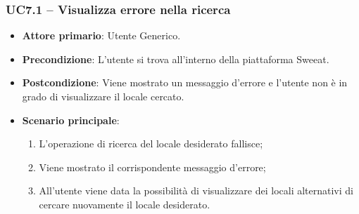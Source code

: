 \subsubsection{UC7.1 – Visualizza errore nella ricerca}
\begin{itemize}
\item \textbf{Attore primario}: Utente Generico.
\item \textbf{Precondizione}: L'utente si trova all’interno della piattaforma Sweeat.
\item \textbf{Postcondizione}: Viene mostrato un messaggio d'errore e l'utente non è in grado di visualizzare il locale cercato.

\item \textbf{Scenario principale}:
\begin{enumerate}
	\item L'operazione di ricerca del locale desiderato fallisce;
	\item Viene mostrato il corrispondente messaggio d'errore;
	\item All'utente viene data la possibilità di visualizzare dei locali alternativi di cercare nuovamente il locale desiderato.
\end{enumerate}
\end{itemize}